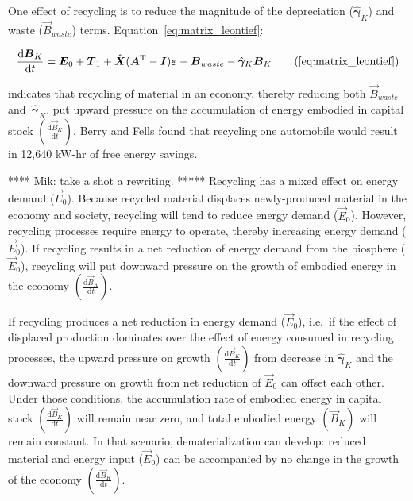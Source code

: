 One effect of recycling is to reduce the magnitude 
of the depreciation ($\hat{\bm{\gamma}}_{K}$)
and waste ($\vec{B}_{waste}$) terms. 
Equation~\ref{eq:matrix_leontief}:

\begin{equation}
	\frac{\mathrm{d}\vec{B}_{K}}{\mathrm{d}t} 
	= \vec{E}_{0}
	+ \vec{T}_{1}
	+ \hat{\vec{X}} (\vec{A}^{\mathrm{T}} - \vec{I})\bm{\varepsilon} 
	- \vec{B}_{waste}
	- \hat{\bm{\gamma}}_{K}\vec{B}_{K}\tag{\ref{eq:matrix_leontief}}
\end{equation}

\noindent{}indicates that 
recycling of material in an economy, 
thereby reducing both $\vec{B}_{waste}$ 
and~$\hat{\bm{\gamma}}_{K}$, 
put upward pressure on the accumulation of energy embodied 
in capital stock
$\left(\frac{\mathrm{d}\vec{B}_{K}}{\mathrm{d}t}\right)$. 
Berry and Fells found that recycling one automobile
would result in 12,640 kW-hr of free energy savings.\cite[p. 15]{Berry:1973vo}

**** Mik: take a shot a rewriting. ***** 
Recycling has a mixed effect on energy demand ($\vec{E}_{0}$). 
Because recycled material displaces newly-produced material 
in the economy and society, 
recycling will tend to reduce energy demand ($\vec{E}_{0}$). 
However, recycling processes require energy to operate, 
thereby increasing energy demand ($\vec{E}_{0}$). 
If recycling results in a net reduction of energy demand 
from the biosphere ($\vec{E}_{0}$), 
recycling will put downward pressure on the growth 
of embodied energy in the economy
$\left(\frac{\mathrm{d}\vec{B}_{K}}{\mathrm{d}t}\right)$. 

If recycling produces a net reduction in energy demand ($\vec{E}_{0}$), 
i.e.\ if the effect of displaced production dominates over the effect 
of energy consumed in recycling processes, 
the upward pressure on growth $\left(\frac{\mathrm{d}\vec{B}_{K}}{\mathrm{d}t}\right)$ 
from decrease in $\hat{\bm{\gamma}}_{K}$ and 
the downward pressure on growth from net reduction of $\vec{E}_{0}$ 
can offset each other.
Under those conditions, 
the accumulation rate of embodied energy in capital stock
$\left(\frac{\mathrm{d}\vec{B}_{K}}{\mathrm{d}t}\right)$ 
will remain near zero, 
and total embodied energy $(\vec{B}_{K})$ will remain constant. 
In that scenario, dematerialization can develop: 
reduced material and energy input ($\vec{E}_{0}$) can be accompanied by 
no change in
the growth of the economy
$\left(\frac{\mathrm{d}\vec{B}_{K}}{\mathrm{d}t}\right)$.


